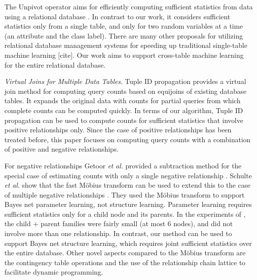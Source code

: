 \documentclass{vldb}
\begin{document}
The Unpivot operator aims for efficiently computing sufficient statistics from data using a relational database \cite{unpivot_kdd98}. In contrast to our work, it considers sufficient statistics only from a single table, and only for two random variables at a time (an attribute and the class label). There are many other proposals for utilizing relational database management systems for speeding up traditional single-table machine learning [cite]. Our work aims to support cross-table machine learning for the entire relational database.

{\em Virtual Joins for Multiple Data Tables.} Tuple ID propagation provides a virtual join method for computing query counts based on equijoins of existing database tables. It expands the original data with counts for partial queries from which complete counts can be computed quickly. In terms of our algorithm, Tuple ID propagation can be used to compute counts for sufficient statistics that involve positive relationships only. Since the case of positive relationships has been treated before, this paper focuses on computing query counts with a combination of positive and negative relationships. 

For negative relationships Getoor {\em et al.} provided a subtraction method for the special case of estimating counts with only a single negative relationship \cite[Sec.5.8.4.2]{Getoor2007c}. Schulte {\em et al.} show that the fast M\"obius transform can be used to extend this to the case of multiple negative relationships \cite{Schulte2014}. They used the M\"obius transform to support Bayes net parameter learning, not structure learning. Parameter learning requires sufficient statistics only for a child node and its parents. In the experiments of \cite{Schulte2014}, the child + parent families were fairly small (at most 6 nodes), and did not involve more than one relationship. In contrast, our method can be used to support Bayes net structure learning, which requires joint sufficient statistics over the entire database. Other novel aspects compared to the M\"obius transform are the contingency table operations and the use of the relationship chain lattice to facilitate dynamic programming. 
\end{document}
